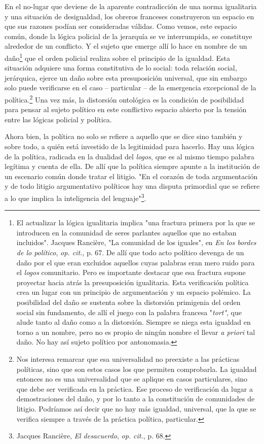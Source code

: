 En el no-lugar que deviene de la aparente contradicción de una norma
igualitaria y una situación de desigualdad, los obreros franceses
construyeron un espacio en que sus razones podían ser consideradas
válidas. Como vemos, este espacio común, donde la lógica policial de la
jerarquía se ve interrumpida, se constituye alrededor de un conflicto. Y
el sujeto que emerge allí lo hace en nombre de un daño\footnote{El
  actualizar la lógica igualitaria implica "una fractura primera por la
  que se introducen en la comunidad de seres parlantes aquellos que no
  estaban incluidos". Jacques Rancière, "La comunidad de los iguales",
  en \emph{En los bordes de lo político}, \emph{op. cit.}, p. 67. De
  allí que todo acto político devenga de un daño por el que eran
  excluidos aquellos cuyas palabras eran mero ruido para el \emph{logos}
  comunitario. Pero es importante destacar que esa fractura supone
  proyectar hacia atrás la presuposición igualitaria. Esta verificación
  política crea un lugar con un principio de argumentación y un espacio
  polémico. La posibilidad del daño se sustenta sobre la distorsión
  primigenia del orden social sin fundamento, de allí el juego con la
  palabra francesa "\emph{tort"}, que alude tanto al daño como a la
  distorsión. Siempre se niega esta igualdad en torno a un nombre, pero
  no es propio de ningún nombre el llevar \emph{a priori} tal daño. No
  hay así sujeto político por antonomasia.} que el orden policial
realiza sobre el principio de la igualdad. Esta situación adquiere una
forma constitutiva de lo social: toda relación social, jerárquica,
ejerce un daño sobre esta presuposición universal, que sin embargo solo
puede verificarse en el caso -- particular -- de la emergencia
excepcional de la política.\footnote{Nos interesa remarcar que esa
  universalidad no preexiste a las prácticas políticas, sino que son
  estos casos los que permiten comprobarla. La igualdad entonces no es
  una universalidad que se aplique en casos particulares, sino que debe
  ser verificada en la práctica. Ese proceso de verificación da lugar a
  demostraciones del daño, y por lo tanto a la constitución de
  comunidades de litigio. Podríamos así decir que no hay más igualdad,
  universal, que la que se verifica siempre a través de la práctica
  política, particular.} Una vez más, la distorsión ontológica es la
condición de posibilidad para pensar al sujeto político en este
conflictivo espacio abierto por la tensión entre las lógicas policial y
política.

Ahora bien, la política no solo se refiere a aquello que se dice sino
también y sobre todo, a quién está investido de la legitimidad para
hacerlo. Hay una lógica de la política, radicada en la dualidad del
\emph{logos}, que es al mismo tiempo palabra legítima y cuenta de ella.
De allí que la política siempre apunte a la institución de un escenario
común donde tratar el litigio. "En el corazón de toda argumentación y de
todo litigio argumentativo políticos hay una disputa primordial que se
refiere a lo que implica la inteligencia del lenguaje"\footnote{Jacques
  Rancière, \emph{El desacuerdo}, \emph{op. cit.}, p. 68.}.

